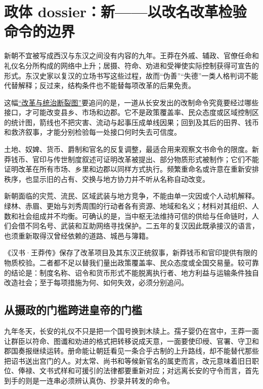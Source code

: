\section{政体 dossier：新——以改名改革检验命令的边界}
\label{sec:polity-xin}

新朝不宜被写成西汉与东汉之间没有内容的九年。王莽在外戚、辅政、官僚任命和礼仪名分所构成的网络中上升；居摄、符命、劝进和受禅使实际控制获得可宣告的形式。东汉史家以复汉的立场书写这些过程，故而“伪善”“失德”一类人格判词不能代替解释；反过来，结构条件也不能替每项改革的后果免责。

这幅\hyperref[fig:xin-reform-fracture]{“改革与统治断裂图”}要追问的是，一道从长安发出的改制命令究竟要经过哪些接口，才可能改变县乡、市场和边郡。它不是政策覆盖率、民众态度或区域控制区的统计图，箭线也不把灾害、流动与起事压成单线因果；回到及其后的田界、钱币和救济叙事，才能分别检验每一处接口何时失去可信度。


土地、奴婢、货币、爵制和官名的反复调整，最适合用来观察文书命令的限度。新莽钱币、官印与传世制度叙述可证明改革被提出、部分物质形式被制作；它们不能证明改革在所有市场、乡里和边郡以同样方式执行。频繁重命名或许意在重新安排秩序，也显示旧的占有、交换与地方协力并不听从名称自动改变。

新朝面临的灾荒、流民、区域武装与地方竞争，不能由单一灾因或个人动机解释。绿林、赤眉、更始与刘秀周围的行动者各有资源、地域和名义；材料对其组织、人数和社会组成并不均衡。可确认的是，当中枢无法维持可信的供给与任命链时，人们会借不同名号、武装和互助网络寻找保护。二五年的复汉因此既承接汉的语言，也须重新取得汉曾经依赖的道路、城邑与簿籍。

\begin{debate}[改革失败能否说明改革本身荒诞]
《汉书·王莽传》保存了改革项目及其东汉正统叙事，新莽钱币和官印提供有限的物质校验。二者都不足以替我们量出政策覆盖率、民众态度或全国交易量。较可靠的结论是：制度名称、诏令和货币形式不能脱离执行者、地方利益与运输条件独自改造社会；至于每项措施为何、如何失效，必须分别追问。
\end{debate}

\subsection{从摄政的门槛跨进皇帝的门槛}

九年冬天，长安的礼仪不只是把一个国号换到木牍上。孺子婴仍在宫中，王莽一面让群臣以符命、图谶和劝进的格式把转移说成天意，一面要使印绶、官署、守卫和郡国奏报继续运转。册命能让朝廷看见一条合乎古制的上升路线，却不能替代那些把诏书送出宫门的人。对太常、尚书和等候新官名的属吏而言，改元意味着旧日职位、俸禄、文书式样和可援引的法律都要重新对应；对远离长安的守令而言，首先到手的则是一连串必须辨认真伪、抄录并转发的命令。

